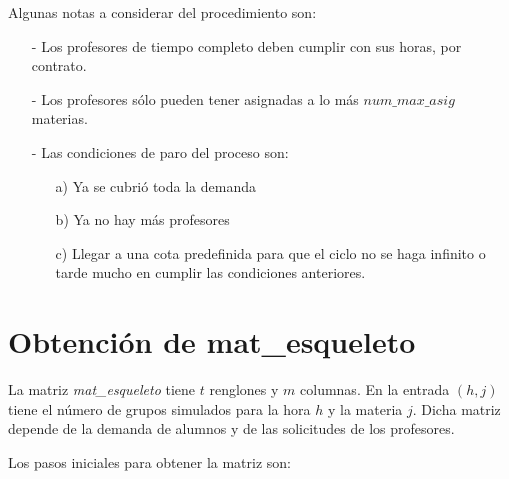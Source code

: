 Algunas notas a considerar del procedimiento son:
  
  \begin{itemize}

\item[-] Los profesores de tiempo completo deben cumplir con sus horas, por contrato.

\item[-] Los profesores sólo pueden tener asignadas a lo más $num\_max\_asig$ materias.

\item[-] Las condiciones de paro del proceso son:
  
  \begin{itemize}
\item[a)] Ya se cubrió toda la demanda

\item[b)] Ya no hay más profesores

\item[c)] Llegar a una cota predefinida para que el ciclo no se haga infinito o tarde mucho en cumplir las condiciones anteriores.
\end{itemize}
\end{itemize}


\section{Obtención de mat\_esqueleto} \label{sec_esqueletos}

La matriz \textit{mat\_esqueleto} tiene $t$ renglones y $m$ columnas. En la entrada $(h,j)$ tiene el número de grupos simulados para la hora $h$ y la materia $j$. Dicha matriz depende de la demanda de alumnos y de las solicitudes de los profesores.


Los pasos iniciales para obtener la matriz son:

